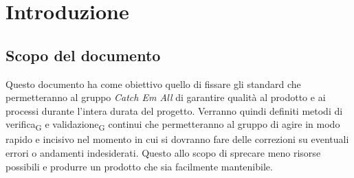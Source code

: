 \section{Introduzione}

\subsection{Scopo del documento}
Questo documento ha come obiettivo quello di fissare gli standard che permetteranno al gruppo \textit{Catch Em All} di garantire qualità al prodotto e ai processi durante l'intera durata del progetto. Verranno quindi definiti metodi di verifica\textsubscript{G} e validazione\textsubscript{G} continui che permetteranno al gruppo di agire in modo rapido e incisivo nel momento in cui si dovranno fare delle correzioni su eventuali errori o andamenti indesiderati. Questo allo scopo di sprecare meno risorse possibili e produrre un prodotto che sia facilmente mantenibile. 

